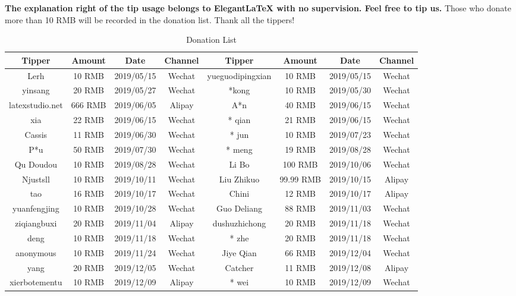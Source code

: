\documentclass[11pt,en,cite=authoryear]{elegantpaper}
\begin{document}
\textbf{The explanation right of the tip usage belongs to Elegant\LaTeX{} with no supervision. Feel free to tip us.} Those who donate more than 10 RMB will be recorded in the donation list. Thank all the tippers!


\begin{table}[!htb]
	\centering
	\caption{Donation List}
	\begin{tabular}{*{4}{>{\scriptsize}c}|*{4}{>{\scriptsize}c}}
	  \toprule
	  \textbf{Tipper} & \textbf{Amount} & \textbf{Date} & \textbf{Channel} & \textbf{Tipper} & \textbf{Amount} & \textbf{Date} & \textbf{Channel} \\
	  \midrule
	  Lerh  & 10 RMB & 2019/05/15 & Wechat    & yueguodipingxian & 10 RMB & 2019/05/15 & Wechat \\
	  yinsang    & 20 RMB & 2019/05/27 & Wechat    & *kong    & 10 RMB & 2019/05/30 & Wechat \\
	  latexstudio.net & 666 RMB & 2019/06/05 & Alipay   & A*n   & 40 RMB & 2019/06/15 & Wechat \\
	  * xia   & 22 RMB & 2019/06/15 & Wechat    & * qian  & 21 RMB  & 2019/06/15 & Wechat \\
	  Cassis & 11 RMB & 2019/06/30 & Wechat    & * jun    & 10 RMB & 2019/07/23 & Wechat \\
	  P*u   & 50 RMB & 2019/07/30 & Wechat    & * meng    & 19 RMB & 2019/08/28 & Wechat \\
	  Qu Doudou   & 10 RMB & 2019/08/28 & Wechat    & Li Bo    & 100 RMB & 2019/10/06 & Wechat \\
	  Njustsll & 10 RMB & 2019/10/11 & Wechat    & Liu Zhikuo   & 99.99 RMB & 2019/10/15 & Alipay \\
	  * tao   & 16 RMB & 2019/10/17 & Wechat    & Chini    & 12 RMB & 2019/10/17 & Alipay \\
	  yuanfengjing & 10 RMB & 2019/10/28 & Wechat    & Guo Deliang   & 88 RMB & 2019/11/03 & Wechat \\
	  ziqiangbuxi  & 20 RMB & 2019/11/04 & Alipay   & dushuzhichong  & 20 RMB & 2019/11/18 & Wechat \\
	  * deng    & 10 RMB & 2019/11/18 & Wechat    & * zhe   & 20 RMB & 2019/11/18 & Wechat \\
	  anonymous    & 10 RMB & 2019/11/24 & Wechat    & Jiye Qian & 66 RMB & 2019/12/04 & Wechat \\
	  * yang   & 20 RMB & 2019/12/05 & Wechat    & Catcher & 11 RMB & 2019/12/08 & Alipay \\
	  xierbotementu & 10 RMB & 2019/12/09 & Alipay   & * wei   & 10 RMB & 2019/12/09 & Wechat \\

\end{tabular}
\end{table}
\end{document}
